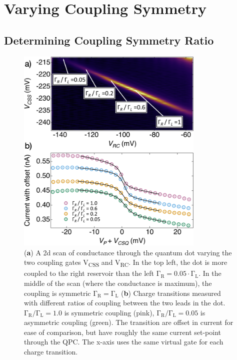 \section{Varying Coupling Symmetry}

\subsection{Determining Coupling Symmetry Ratio}

\begin{figure}[!bht]
  \begin{center}
    \includegraphics[width=0.8\textwidth]{figures/ch3/crop_FiguresMaster.018.png}
    \caption[Conductance vs. Occupation : Picking locations of varying coupling symmetry]{\label{fig:ch3/symmetry_picking} 
     (\textbf{a}) A 2d scan of conductance through the quantum dot varying the two coupling gates V\textsubscript{CSS} and V\textsubscript{RC}. In the top left, the dot is more coupled to the right reservoir than the left $\mathrm{\Gamma_R} = 0.05\cdot\mathrm{\Gamma_L}$. In the middle of the scan (where the conductance is maximum), the coupling is symmetric $\mathrm{\Gamma_R} = \mathrm{\Gamma_L}$ (\textbf{b}) Charge transitions measured with different ratios of coupling between the two leads in the dot. $\mathrm{\Gamma_R/\Gamma_L} = 1.0$ is symmetric coupling (pink), $\mathrm{\Gamma_R/\Gamma_L} = 0.05$ is asymmetric coupling (green). The transition are offset in current for ease of comparison, but have roughly the same current set-point through the QPC. The x-axis uses the same virtual gate for each charge transition. 
    }
  \end{center}
\end{figure}



